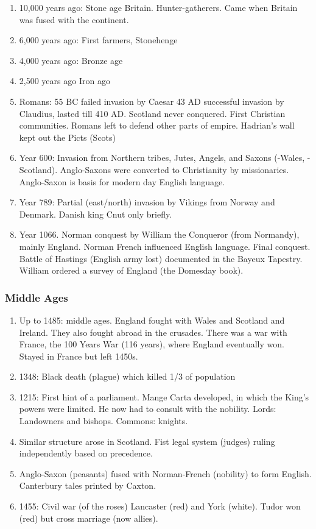 \documentclass[10pt,reqno]{amsart}
\begin{document}
\begin{enumerate}[i]
\item 10,000 years ago:
Stone age Britain. Hunter-gatherers. Came when Britain was fused with the continent. 
\item 6,000 years ago:
First farmers, Stonehenge 
\item 4,000 years ago:
Bronze age
\item 2,500 years ago
Iron ago 
\item Romans:
55 BC failed invasion by Caesar
43 AD successful invasion by Claudius, lasted till 410 AD. Scotland never conquered. 
First Christian communities. Romans left to defend other parts of empire. 
Hadrian's wall kept out the Picts (Scots)
\item Year 600: Invasion from Northern tribes, Jutes, Angels, and Saxons (-Wales, - Scotland). Anglo-Saxons were converted to Christianity by missionaries. Anglo-Saxon is basis for modern day English language. 
\item Year 789: Partial (east/north) invasion by Vikings from Norway and Denmark.  Danish king Cnut only briefly. 
\item Year 1066. Norman conquest by William the Conqueror (from Normandy), mainly England. Norman French influenced English language. Final conquest. Battle of Hastings (English army lost) documented in the Bayeux Tapestry. William ordered a survey of England (the Domesday book). 
\end{enumerate}


\subsubsection{Middle Ages}


\begin{enumerate}[i]
\item Up to 1485: middle ages. 
England fought with Wales and Scotland and Ireland. They also fought abroad in the crusades. There was a war with France, the 100 Years War (116 years), where England eventually won. Stayed in France but left 1450s. 
\item 1348: Black death (plague) which killed 1/3 of population
\item 1215: First hint of a parliament. Mange Carta developed, in which the King's powers were limited. He now had to consult with the nobility. 
Lords: Landowners and bishops.
Commons: knights. 
\item Similar structure arose in Scotland. 
Fist legal system (judges) ruling independently based on precedence. 
\item Anglo-Saxon (peasants) fused with Norman-French (nobility) to form English. Canterbury tales printed by Caxton. 
\item 1455: Civil war (of the roses) Lancaster (red) and York (white). Tudor won (red) but cross marriage (now allies). 
\end{enumerate}
\end{document}
